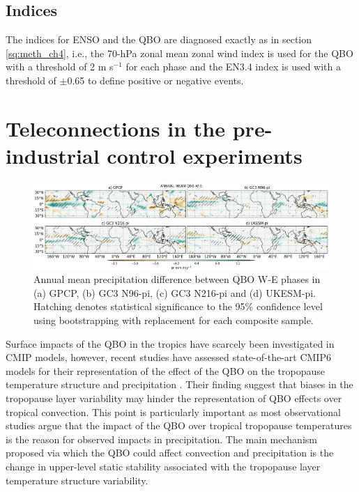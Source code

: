 \subsection{Indices}

The indices for ENSO and the QBO are diagnosed exactly as in section \ref{sq:meth_ch4}, i.e., the 70-hPa zonal mean zonal wind index is used for the QBO with a threshold of 2 m s$^{-1}$ for each phase and the EN3.4 index is used with a threshold of $\pm$0.65 to define positive or negative events.

\section{Teleconnections in the pre-industrial control experiments}

\begin{figure}[b!]
\centering
 \includegraphics[width=\linewidth]{figures/piprclimqbowqboe.png}
\caption[Annual mean precipitation composite difference QBO W-E ]{ Annual mean precipitation difference between QBO W-E phases in (a) GPCP, (b) GC3 N96-pi, (c) GC3 N216-pi and (d) UKESM-pi. Hatching denotes statistical significance to the 95\% confidence level using bootstrapping with replacement for each composite sample. }
\label{fig:qboclim}
\end{figure}

Surface impacts of the QBO in the tropics have scarcely been investigated in CMIP models, however, recent studies have assessed state-of-the-art CMIP6 models for their representation of the effect of the QBO on the tropopause temperature structure and precipitation \citep{serva2021}.
Their finding suggest that biases in the tropopause layer variability may hinder the representation of QBO effects over tropical convection. 
This point is particularly important as most observational studies argue that the impact of the QBO over tropical tropopause temperatures is the reason for observed impacts in precipitation. The main mechanism proposed via which the QBO could affect convection and precipitation is the change in upper-level static stability associated with the tropopause layer temperature structure variability. 

